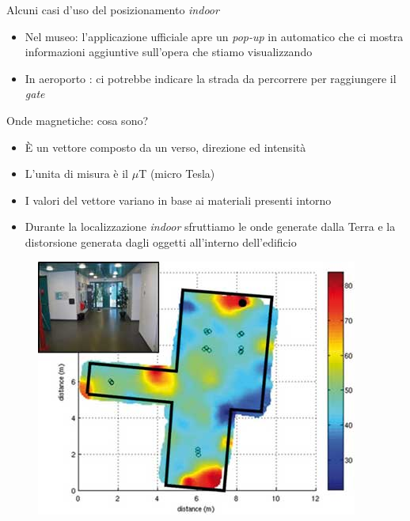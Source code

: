\documentclass[11pt]{beamer}
\begin{document}
	\begin{frame}{Alcuni casi d'uso del posizionamento \textit{indoor}}
		\begin{itemize}
			\item Nel museo: l'applicazione ufficiale apre un \textit{pop-up} in automatico che ci mostra informazioni aggiuntive sull'opera che stiamo visualizzando
			\item In aeroporto : ci potrebbe indicare la strada da percorrere per raggiungere il \textit{gate} 
		\end{itemize}
	\end{frame}
	\begin{frame}{Onde magnetiche: cosa sono?}
		\begin{itemize}
			\item \`E un vettore composto da un verso, direzione ed intensit\`a
			\item L'unita di misura \`e il $\mu$T (micro Tesla)
			\item I valori del vettore variano in base ai materiali presenti intorno
			\item Durante la localizzazione \textit{indoor} sfruttiamo le onde generate dalla Terra e la distorsione generata dagli oggetti all'interno dell'edificio
		\end{itemize}
		\begin{figure}
			\centering
			\includegraphics[width=0.5\linewidth]{img/magnetic_field_map}
		\end{figure}
	\end{frame}
\end{document}
